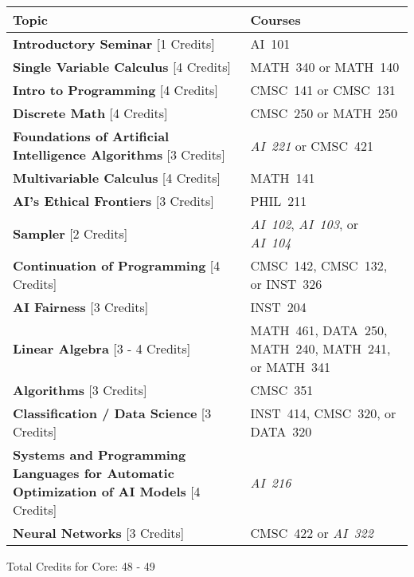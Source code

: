 \begin{longtable}{p{7cm}>{\raggedleft\arraybackslash}p{7cm}}
Topic & Courses \\
\toprule
\textbf{Introductory Seminar} [1 Credits] & AI~101                         \\
\textbf{Single Variable Calculus} [4 Credits] & MATH~340 or MATH~140       \\
\textbf{Intro to Programming} [4 Credits] & CMSC~141 or CMSC~131           \\
\textbf{Discrete Math} [4 Credits] & CMSC~250 or MATH~250                  \\
\textbf{Foundations of Artificial Intelligence Algorithms} [3 Credits] & \textit{AI~221} or CMSC~421 \\
\textbf{Multivariable Calculus} [4 Credits] & MATH~141                     \\
\textbf{AI's Ethical Frontiers} [3 Credits] & PHIL~211                     \\
\textbf{Sampler} [2 Credits] & \textit{AI~102}, \textit{AI~103}, or \textit{AI~104} \\
\textbf{Continuation of Programming} [4 Credits] & CMSC~142, CMSC~132, or INST~326 \\
\textbf{AI Fairness} [3 Credits] & INST~204                                \\
\textbf{Linear Algebra} [3 - 4 Credits] & MATH~461, DATA~250, MATH~240, MATH~241, or MATH~341 \\
\textbf{Algorithms} [3 Credits] & CMSC~351                                 \\
\textbf{Classification / Data Science} [3 Credits] & INST~414, CMSC~320, or DATA~320 \\
\textbf{Systems and Programming Languages for Automatic Optimization of AI Models} [4 Credits] & \textit{AI~216} \\
\textbf{Neural Networks} [3 Credits] & CMSC~422 or \textit{AI~322}         \\
\bottomrule
\end{longtable}
Total Credits for Core: 48 - 49
